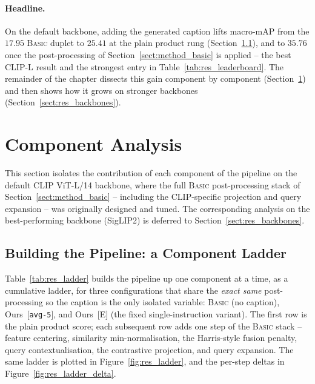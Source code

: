 \paragraph{Headline.}
On the default backbone, adding the generated caption lifts macro-mAP from the
$17.95$ \textsc{Basic} duplet to $25.41$ at the plain product rung
(Section~\ref{subsect:res_ladder}), and to $35.76$ once the post-processing of
Section~\ref{sect:method_basic} is applied -- the best CLIP-L result and the
strongest entry in Table~\ref{tab:res_leaderboard}. The remainder of the chapter
dissects this gain component by component (Section~\ref{sect:res_components}) and
then shows how it grows on stronger backbones (Section~\ref{sect:res_backbones}).

\section{Component Analysis}\label{sect:res_components}

This section isolates the contribution of each component of the pipeline on the
default CLIP ViT-L/14 backbone, where the full \textsc{Basic} post-processing
stack of Section~\ref{sect:method_basic} -- including the CLIP-specific
projection and query expansion -- was originally designed and tuned. The
corresponding analysis on the best-performing backbone (SigLIP2) is deferred to
Section~\ref{sect:res_backbones}.

\subsection{Building the Pipeline: a Component Ladder}\label{subsect:res_ladder}

Table~\ref{tab:res_ladder} builds the pipeline up one component at a time, as a
cumulative ladder, for three configurations that share the \emph{exact same}
post-processing so the caption is the only isolated variable: \textsc{Basic}
(no caption), Ours~[\texttt{avg-5}], and Ours~[\textsc{E}] (the fixed
single-instruction variant). The first row is the plain product score; each
subsequent row adds one step of the \textsc{Basic} stack -- feature centering,
similarity min-normalisation, the Harris-style fusion penalty, query
contextualisation, the contrastive projection, and query expansion. The same
ladder is plotted in Figure~\ref{fig:res_ladder}, and the per-step deltas in
Figure~\ref{fig:res_ladder_delta}.

